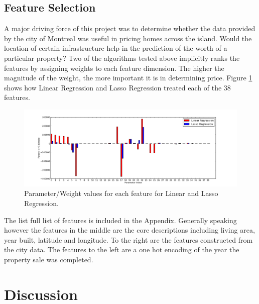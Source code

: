 \documentclass{acm_proc_article-sp}
\begin{document}
\subsection{Feature Selection}
	A major driving force of this project was to determine whether the data provided by the city of Montreal was useful in pricing homes across the island. Would the location of certain infrastructure help in the prediction of the worth of a particular property? Two of the algorithms tested above implicitly ranks the features by assigning weights to each feature dimension. The higher the magnitude of the weight, the more important it is in determining price. Figure \ref{fig:feats} shows how Linear Regression and Lasso Regression treated each of the 38 features. 
	
	 \begin{figure}[!htbp]
   		\centering
  		\includegraphics[width=\textwidth]{parameter_values.png}
    		\caption{Parameter/Weight values for each feature for Linear and Lasso Regression.}
    		\label{fig:feats}
	\end{figure}
	
	The list full list of features is included in the Appendix. Generally speaking however the features in the middle are the core descriptions including living area, year built, latitude and longitude. To the right are the features constructed from the city data. The features to the left are a one hot encoding of the year the property sale was completed.

\section{Discussion}
\end{document}
